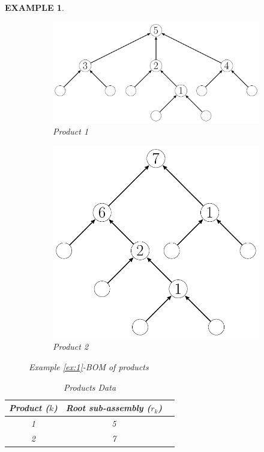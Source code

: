 \documentclass[twoside,onecolumn,12pt,letterpaper]{article}
\newtheorem{example}{EXAMPLE}
\begin{document}
\begin{example}
%
\begin{figure}[htbp]
\centering
\begin{subfigure}{0.6\textwidth}
\centering
\includegraphics[width=\linewidth]{figure_prod1_bom.pdf}
\caption{Product 1}
\label{fig:bom_prod1}
\end{subfigure}%
\begin{subfigure}{0.4\textwidth}
\centering
\includegraphics[width=\linewidth]{figure_prod2_bom.pdf}
\caption{Product 2}
\label{fig:bom_prod2}
\end{subfigure} 
\caption{Example \ref{ex:1}-BOM of products}
\label{fig:normal_bom_prods}
\end{figure}
%
\begin{table}[htbp]
\centering
\caption{Products Data}
\label{table:products_data}
\begin{tabular}{|c|c|c|}
\hline
Product ($k$) & Root sub-assembly ($r_k$) \\ \hline
1 & 5 \\
2 & 7 \\
\hline
\end{tabular}
\end{table}


\end{example}
\end{document}
